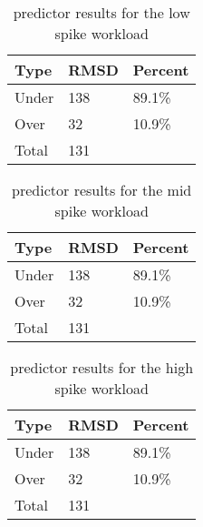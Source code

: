 \begin{table}[H]
\centering
\begin{tabular}{| l | l | l |}
\hline
Type & RMSD & Percent \\ \hline
Under & 138 & 89.1\% \\ \hline
Over & 32 & 10.9\% \\ \hline
Total & 131 & \\ \hline
\end{tabular}
\caption{predictor results for the low spike workload}
\end{table}

\begin{table}[H]
\centering
\begin{tabular}{| l | l | l |}
\hline
Type & RMSD & Percent \\ \hline
Under & 138 & 89.1\% \\ \hline
Over & 32 & 10.9\% \\ \hline
Total & 131 & \\ \hline
\end{tabular}
\caption{predictor results for the mid spike workload}
\end{table}

\begin{table}[H]
\centering
\begin{tabular}{| l | l | l |}
\hline
Type & RMSD & Percent \\ \hline
Under & 138 & 89.1\% \\ \hline
Over & 32 & 10.9\% \\ \hline
Total & 131 & \\ \hline
\end{tabular}
\caption{predictor results for the high spike workload}
\end{table}